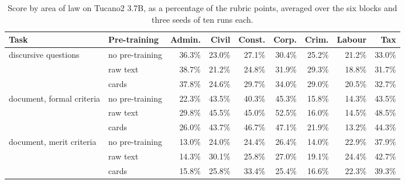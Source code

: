 \documentclass{IOS-Book-Article}
\begin{document}
\begin{table}[!ht]
\centering
\caption{Score by area of law on Tucano2 3.7B, as a percentage of the rubric points, averaged over the six blocks and three seeds of ten runs each.}
\footnotesize\setlength{\tabcolsep}{3pt}
\begin{tabular}{llrrrrrrr}
\hline
\textbf{Task} & \textbf{Pre-training} & \textbf{Admin.} & \textbf{Civil} & \textbf{Const.} & \textbf{Corp.} & \textbf{Crim.} & \textbf{Labour} & \textbf{Tax} \\
\hline
\multirow{3}{*}{discursive questions} & no pre-training & 36.3\% & 23.0\% & 27.1\% & 30.4\% & 25.2\% & 21.2\% & 33.0\% \\
 & raw text & 38.7\% & 21.2\% & 24.8\% & 31.9\% & 29.3\% & 18.8\% & 31.7\% \\
 & cards & 37.8\% & 24.6\% & 29.7\% & 34.0\% & 29.0\% & 20.5\% & 32.7\% \\
\multirow{3}{*}{document, formal criteria} & no pre-training & 22.3\% & 43.5\% & 40.3\% & 45.3\% & 15.8\% & 14.3\% & 43.5\% \\
 & raw text & 29.8\% & 45.5\% & 45.0\% & 52.5\% & 16.0\% & 14.5\% & 48.5\% \\
 & cards & 26.0\% & 43.7\% & 46.7\% & 47.1\% & 21.9\% & 13.2\% & 44.3\% \\
\multirow{3}{*}{document, merit criteria} & no pre-training & 13.0\% & 24.0\% & 24.4\% & 26.4\% & 14.0\% & 22.9\% & 37.9\% \\
 & raw text & 14.3\% & 30.1\% & 25.8\% & 27.0\% & 19.1\% & 24.4\% & 42.7\% \\
 & cards & 15.8\% & 25.8\% & 33.4\% & 25.4\% & 16.6\% & 22.3\% & 39.3\% \\
\hline
\end{tabular}
\end{table}
\end{document}
